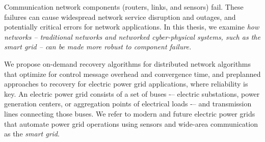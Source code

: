 

Communication network components (routers, links, and sensors) fail. %
These failures can cause widespread network service disruption and outages, and potentially critical errors for network applications.
In this thesis, we examine \textit{how networks -- traditional networks and networked cyber-physical systems, such as the smart grid -- can be made more robust to component failure.}

We propose on-demand recovery algorithms for distributed network algorithms that optimize for control message overhead and convergence time,
and preplanned approaches to recovery for electric power grid applications, where reliability is key. 
An electric power grid consists of a set of buses -– electric substations, power generation centers, or aggregation points of electrical loads -– and transmission lines connecting those buses.
We refer to modern and future electric power grids that automate power grid operations using sensors and wide-area communication as the \emph{smart grid}.





